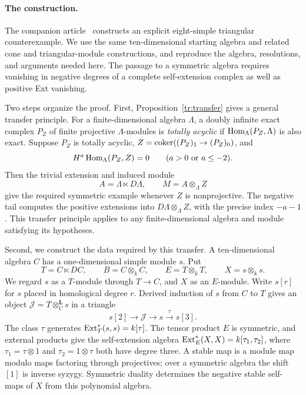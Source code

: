 \paragraph{The construction.}
The companion article~\cite{OpenAIAR2026} constructs an explicit
eight-simple triangular counterexample. We use the same ten-dimensional
starting algebra and related cone and triangular-module constructions,
and reproduce the algebra, resolutions, and arguments needed here.
The passage to a symmetric algebra requires vanishing in negative
degrees of a complete self-extension complex as well as positive Ext
vanishing.

Two steps organize the proof.  First, Proposition~\ref{tr:transfer}
gives a general transfer principle. For a finite-dimensional algebra
$\Lambda$, a doubly infinite exact complex $P_Z$ of finite projective
$\Lambda$-modules is \emph{totally acyclic}
if $\operatorname{Hom}_\Lambda(P_Z,\Lambda)$ is also exact. Suppose
$P_Z$ is totally acyclic, $Z=\operatorname{coker}((P_Z)_1\to(P_Z)_0)$, and
\begin{equation}\label{intro:profile}
 H^a\operatorname{Hom}_\Lambda(P_Z,Z)=0
 \qquad(a>0\ \text{or}\ a\leq-2).
\end{equation}
Then the trivial extension and induced module
\[
 A=\Lambda\ltimes D\Lambda,
 \qquad M=A\otimes_\Lambda Z
\]
give the required symmetric example whenever $Z$ is nonprojective.
The negative tail computes the positive extensions into
$D\Lambda\otimes_\Lambda Z$, with the precise index $-a-1$.
This transfer principle applies to any finite-dimensional algebra
and module satisfying its hypotheses.

Second, we construct the data required by this transfer. A
ten-dimensional algebra $C$ has a one-dimensional simple module $s$.
Put
\[
 T=C\ltimes DC,\qquad B=C\otimes_k C,
 \qquad E=T\otimes_k T,\qquad X=s\otimes_k s.
\]
We regard $s$ as a $T$-module through $T\to C$, and $X$ as an
$E$-module. Write $s[r]$ for $s$ placed in homological degree $r$.
Derived induction of $s$ from $C$ to $T$ gives an object
$\mathcal J=T\otimes_C^{\mathbf L}s$ in a triangle
\[
 s[2]\longrightarrow\mathcal J\longrightarrow s
 \xrightarrow{\tau}s[3].
\]
The class $\tau$ generates $\operatorname{Ext}_T^*(s,s)=k[\tau]$.
The tensor product $E$ is symmetric, and external products give the
self-extension algebra $\operatorname{Ext}_E^*(X,X)=k[\tau_1,\tau_2]$, where
$\tau_1=\tau\otimes1$ and $\tau_2=1\otimes\tau$ both have degree three.
A stable map is a
module map modulo maps factoring through projectives; over a symmetric
algebra the shift $[1]$ is inverse syzygy. Symmetric duality determines
the negative stable self-maps of $X$ from this polynomial algebra.


